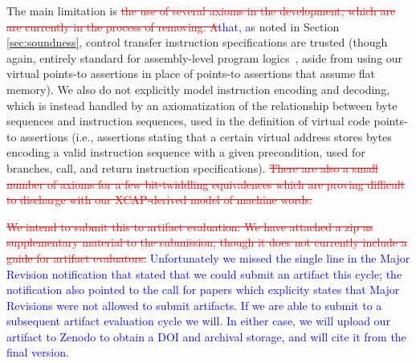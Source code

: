 \documentclass[acmsmall,screen,nonacm,review,anonymous]{acmart}
\newcommand{\add}[1]{\textcolor{blue}{#1}}
\newcommand{\del}[1]{\textcolor{red}{\st{#1}}}
\newcommand{\replace}[2]{\del{#1}\add{#2}}
\newcommand{\add}[1]{{#1}}
\newcommand{\del}[1]{}
\newcommand{\replace}[2]{\del{#1}\add{#2}}
\begin{document}
The main limitation is \replace{the use of several axioms in the development, which are are currently
in the process of removing. A}{that, a}s noted in Section \ref{sec:soundness}, control transfer instruction
specifications are trusted (though again, entirely standard for assembly-level program logics~\cite{ni2007contexts,Ni2006codeptrs},
aside from using our virtual points-to assertions in place of points-to assertions that assume flat memory).
We also do not explicitly model instruction
encoding and decoding, which is instead handled by an axiomatization of the relationship between
byte sequences and instruction sequences, used in the definition of virtual code points-to
assertions (i.e., assertions stating that a certain virtual address stores bytes
encoding a valid instruction sequence with a given precondition, used for branches, call, and return instruction
specifications). 
\del{There are also a small number of axioms for a few bit-twiddling equivalences which are proving difficult to discharge
with our XCAP-derived model of machine words.}

\replace{We intend to submit this to artifact evaluation.
We have attached a zip as supplementary material to the submission, though it does not
currently include
a guide for artifact evaluators.}{
  Unfortunately we missed the single line in the Major Revision notification that stated 
  that we could submit an artifact this cycle; the notification also pointed to the call for papers
  which explicity states that Major Revisions were not allowed to submit artifacts.
  If we are able to submit to a subsequent artifact evaluation cycle we will.
  In either case, we will upload our artifact to Zenodo to obtain a DOI and archival storage,
  and will cite it from the final version.
}
\end{document}
